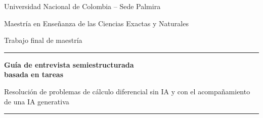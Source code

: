 \documentclass[11pt,letterpaper]{article}
\begin{document}
\begin{titlepage}
\centering
{\large Universidad Nacional de Colombia -- Sede Palmira\par}
{\normalsize Maestría en Enseñanza de las Ciencias Exactas y Naturales\par}
{\normalsize Trabajo final de maestría\par}
\vspace{2.2cm}
{\color{unalverde}\rule{\linewidth}{1pt}\par}
\vspace{0.4cm}
{\LARGE\bfseries Guía de entrevista semiestructurada\\[4pt] basada en tareas\par}
\vspace{0.4cm}
{\large Resolución de problemas de cálculo diferencial sin IA y con el acompañamiento de una IA generativa\par}
\vspace{0.4cm}
{\color{unalverde}\rule{\linewidth}{1pt}\par}
\vspace{1.2cm}


\end{titlepage}
\end{document}

